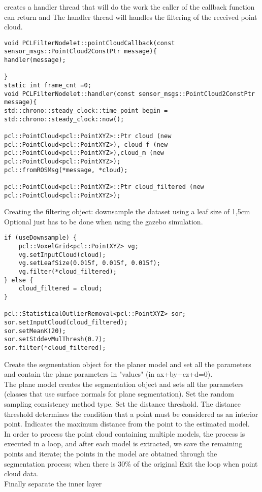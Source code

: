 creates a handler thread that will do the work the caller of the callback function can return and The handler thread will handles the filtering of the received point cloud.
\begin{lstlisting}[caption={}]
void PCLFilterNodelet::pointCloudCallback(const sensor_msgs::PointCloud2ConstPtr message){
handler(message);

}
static int frame_cnt =0;
void PCLFilterNodelet::handler(const sensor_msgs::PointCloud2ConstPtr message){
std::chrono::steady_clock::time_point begin = std::chrono::steady_clock::now();

pcl::PointCloud<pcl::PointXYZ>::Ptr cloud (new pcl::PointCloud<pcl::PointXYZ>), cloud_f (new pcl::PointCloud<pcl::PointXYZ>),cloud_m (new pcl::PointCloud<pcl::PointXYZ>);
pcl::fromROSMsg(*message, *cloud);

pcl::PointCloud<pcl::PointXYZ>::Ptr cloud_filtered (new pcl::PointCloud<pcl::PointXYZ>);
\end{lstlisting}


Creating the filtering object: downsample the dataset using a leaf size of 1,5cm Optional just has to be done when using the gazebo simulation.
\begin{lstlisting}[caption={}]
if (useDownsample) {
	pcl::VoxelGrid<pcl::PointXYZ> vg;
	vg.setInputCloud(cloud);
	vg.setLeafSize(0.015f, 0.015f, 0.015f);
	vg.filter(*cloud_filtered);
} else {
	cloud_filtered = cloud;
}

pcl::StatisticalOutlierRemoval<pcl::PointXYZ> sor;
sor.setInputCloud(cloud_filtered);
sor.setMeanK(20);
sor.setStddevMulThresh(0.7);
sor.filter(*cloud_filtered);
\end{lstlisting}


Create the segmentation object for the planer model and set all the parameters and contain the plane parameters in "values" (in ax+by+cz+d=0).\\
The plane model creates the segmentation object and sets all the parameters (classes that use surface normals for plane segmentation). Set the random sampling consistency method type. Set the distance threshold. The distance threshold determines the condition that a point must be considered as an interior point. Indicates the maximum distance from the point to the estimated model.\\
In order to process the point cloud containing multiple models, the process is executed in a loop, and after each model is extracted, we save the remaining points and iterate; the points in the model are obtained through the segmentation process; when there is 30\% of the original Exit the loop when point cloud data.\\
Finally separate the inner layer\\


